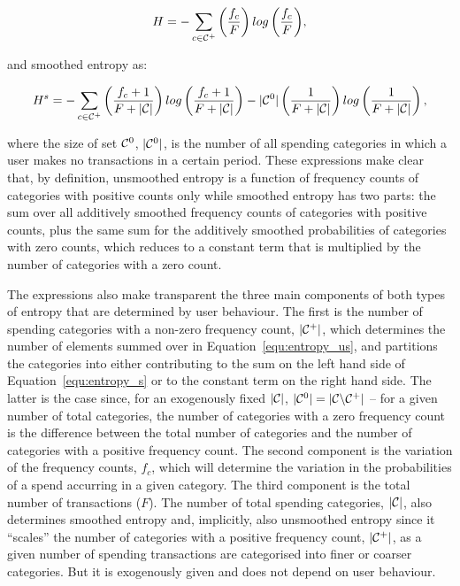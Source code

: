 \begin{equation}
\label{equ:entropy_us}
H = -\sum_{c \in \mathcal{C}^{+}}{\left(\frac{f_c}{F}\right)
log\left(\frac{f_c}{F}\right)},
\end{equation}

and smoothed entropy as:

\begin{equation}
\label{equ:entropy_s}
H^s = -\sum_{c \in \mathcal{C}^{+}}{\left(\frac{f_c + 1}{F + |\mathcal{C}|}\right)
log\left(\frac{f_c + 1}{F + |\mathcal{C}|}\right)}
- |\mathcal{C}^{0}|\left(\frac{1}{F + |\mathcal{C}|}\right)
log\left(\frac{1}{F + |\mathcal{C}|}\right),
\end{equation}

\noindent where the size of set $\mathcal{C}^{0}$, $|\mathcal{C}^{0}|$, is the number of all
spending categories in which a user makes no transactions in a certain period.
These expressions make clear that, by definition, unsmoothed entropy is a
function of frequency counts of categories with positive counts only while
smoothed entropy has two parts: the sum over all additively smoothed frequency
counts of categories with positive counts, plus the same sum for the additively
smoothed probabilities of categories with zero counts, which reduces to a
constant term that is multiplied by the number of categories with a zero count.

The expressions also make transparent the three main components of both types
of entropy that are determined by user behaviour. The first is the number of
spending categories with a non-zero frequency count, $|\mathcal{C}^{+}|$, which
determines the number of elements summed over in Equation~\ref{equ:entropy_us},
and partitions the categories into either contributing to the sum on the left
hand side of Equation~\ref{equ:entropy_s} or to the constant term on the right
hand side. The latter is the case since, for an exogenously fixed $|\mathcal{C}|$,
$|\mathcal{C}^{0}| = |\mathcal{C} \backslash \mathcal{C}^{+}|$ -- for a given number of total
categories, the number of categories with a zero frequency count is the
difference between the total number of categories and the number of categories
with a positive frequency count. The second component is the variation of the
frequency counts, $f_c$, which will determine the variation in the
probabilities of a spend accurring in a given category. The third component is
the total number of transactions ($F$). The number of total spending
categories, $|\mathcal{C}|$, also determines smoothed entropy and, implicitly, also
unsmoothed entropy since it ``scales'' the number of categories with a positive
frequency count, $|\mathcal{C}^{+}|$, as a given number of spending transactions are
categorised into finer or coarser categories. But it is exogenously given and
does not depend on user behaviour.

